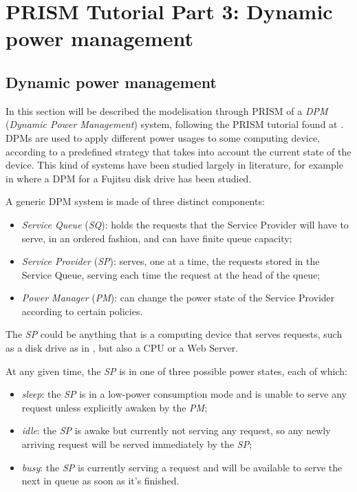 
\section*{PRISM Tutorial Part 3: Dynamic power management}

  \subsection*{Dynamic power management}

    In this section will be described the modelisation through PRISM \cite{KNP11} of a \textit{DPM} (\textit{Dynamic Power Management}) system, following the PRISM tutorial found at \cite{prism-tutorial3}. DPMs are used to apply different power usages to some computing device, according to a predefined strategy that takes into account the current state of the device. This kind of systems have been studied largely in literature, for example in \cite{qiu2001stochastic} where a DPM for a Fujitsu disk drive has been studied.
    
    A generic DPM system is made of three distinct components:
    
    \begin{itemize}
      \item \textit{Service Queue} (\textit{SQ}): holds the requests that the Service Provider will have to serve, in an ordered fashion, and can have finite queue capacity;
      \item \textit{Service Provider} (\textit{SP}): serves, one at a time, the requests stored in the Service Queue, serving each time the request at the head of the queue;
      \item \textit{Power Manager} (\textit{PM}): can change the power state of the Service Provider according to certain policies.
    \end{itemize}
    
    The \textit{SP} could be anything that is a computing device that serves requests, such as a disk drive as in \cite{qiu2001stochastic}, but also a CPU or a Web Server.
    
    At any given time, the \textit{SP} is in one of three possible power states, each of which:
    
    \begin{itemize}
      \item \textit{sleep}: the \textit{SP} is in a low-power consumption mode and is unable to serve any request unless explicitly awaken by the \textit{PM};
      \item \textit{idle}: the \textit{SP} is awake but currently not serving any request, so any newly arriving request will be served immediately by the \textit{SP};
      \item \textit{busy}: the \textit{SP} is currently serving a request and will be available to serve the next in queue as soon as it's finished.
    \end{itemize}
    
